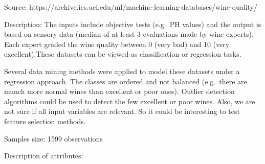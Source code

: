 \documentclass{article}
\begin{document}
Source: https://archive.ics.uci.edu/ml/machine-learning-databases/wine-quality/

Description: The inputs include objective tests (e.g.~PH values) and the
output is based on sensory data (median of at least 3 evaluations made
by wine experts). Each expert graded the wine quality between 0 (very
bad) and 10 (very excellent).These datasets can be viewed as
classification or regression tasks.

Several data mining methods were applied to model these datasets under a
regression approach. The classes are ordered and not balanced
(e.g.~there are munch more normal wines than excellent or poor ones).
Outlier detection algorithms could be used to detect the few excellent
or poor wines. Also, we are not sure if all input variables are
relevant. So it could be interesting to test feature selection methods.

Samples size: 1599 observations

Description of attributes:
\end{document}

